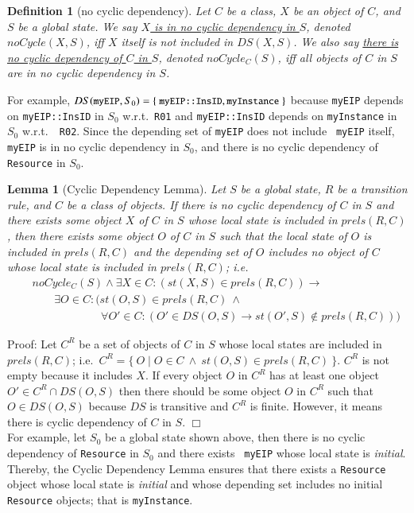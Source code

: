 \documentclass[12pt]{report}
\newtheorem{lemma}{Lemma}
\newtheorem{definition}{Definition}
\newcommand{\ra}{\rightarrow}
\newcommand{\mbstt}[1]{\mbox{\small{\tt {#1}}}}
\newcommand{\stt}[1]{{\small{\tt {#1}}}}
\newcommand{\ul}{\underline}
\begin{document}
\begin{definition}[no cyclic dependency]
Let $C$ be a class, $X$ be an object of $C$, and $S$ be a global
state. We say \ul{$X$ is in no cyclic dependency in $S$}, denoted
\ul{$noCycle(X,S)$}, iff $X$ itself is not included in $DS(X,S)$. We
also say \ul{there is no cyclic dependency of $C$ in $S$}, denoted
\ul{$noCycle_C(S)$}, iff all objects of $C$ in $S$ are in no cyclic
dependency in $S$.
\end{definition}
For example, $DS(\mbstt{myEIP},S_0) =
\{~\mbstt{myEIP::InsID},\mbstt{myInstance}~\}$ because {\tt myEIP}
depends on \stt{myEIP::InsID} in $S_0$ w.r.t.\ {\tt R01} and
\stt{myEIP::InsID} depends on {\tt myInstance} in $S_0$ w.r.t.\ {\tt
  R02}. Since the depending set of {\tt myEIP} does not include {\tt
  myEIP} itself, {\tt myEIP} is in no cyclic dependency in $S_0$, and
there is no cyclic dependency of {\tt Resource} in $S_0$.
\begin{lemma}[Cyclic Dependency Lemma]
Let $S$ be a global state, $R$ be a transition rule, and $C$ be a
class of objects. If there is no cyclic dependency of $C$ in $S$
and there exists some object $X$ of $C$ in $S$ whose local state
is included in $prels(R,C)$, then there exists some object $O$ of $C$ in
$S$ such that the local state of $O$ is included in $prels(R,C)$ and the
depending set of $O$ includes no object of $C$ whose local
state is included in $prels(R,C)$; i.e.
\begin{eqnarray*}
&&noCycle_C(S)\land\exists X\in C:(st(X,S)\in prels(R,C)) \ra\\
&&\:\:\:\:\:\:\:\:\:\exists O\in C:(st(O,S)\in prels(R,C)\ \land\\
&&\:\:\:\:\:\:\:\:\:\:\:\:\:\:\:\:\:\:\:\:\:\:\:\:\:\:\:\:
\forall O'\in C:(O'\in DS(O,S)\ra st(O',S)\not\in prels(R,C)))
\end{eqnarray*}
\end{lemma}
Proof: Let $C^R$ be a set of objects of $C$ in $S$ whose local states
are included in $prels(R,C)$; i.e.\ $C^R=\{~O\mid O\in C~\land~
st(O,S)\in prels(R,C)~\}$. $C^R$ is not empty because it includes $X$.
If every object $O$ in $C^R$ has at least one object $O' \in C^R\cap
DS(O,S)$ then there should be some object $O$ in $C^R$ such that $O
\in DS(O,S)$ because $DS$ is transitive and $C^R$ is finite. However,
it means there is cyclic dependency of $C$ in $S$. $\Box$\\

\noindent
For example, let $S_0$ be a global state shown above, then there is no
cyclic dependency of {\tt Resource} in $S_0$ and there exists {\tt
  myEIP} whose local state is {\it initial}. Thereby, the Cyclic
Dependency Lemma ensures that there exists a {\tt Resource} object
whose local state is {\it initial} and whose depending set includes no
initial {\tt Resource} objects; that is {\tt myInstance}.
\end{document}
